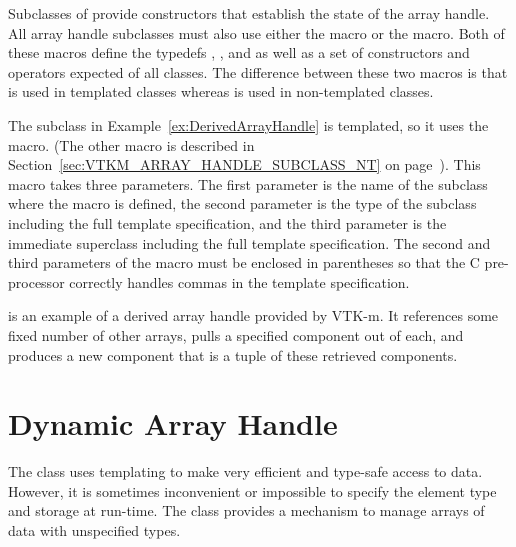 Subclasses of  provide constructors that
establish the state of the array handle. All array handle subclasses must
also use either the  macro or the
 macro. Both of these macros
define the typedefs , , and
 as well as a set of constructors and operators
expected of all  classes. The difference
between these two macros is that 
is used in templated classes whereas
 is used in non-templated
classes.

The  subclass in
Example~\ref{ex:DerivedArrayHandle} is templated, so it uses the
 macro. (The other macro is
described in Section~\ref{sec:VTKM_ARRAY_HANDLE_SUBCLASS_NT} on
page~\pageref{sec:VTKM_ARRAY_HANDLE_SUBCLASS_NT}). This macro takes three
parameters. The first parameter is the name of the subclass where the macro
is defined, the second parameter is the type of the subclass including the
full template specification, and the third parameter is the immediate
superclass including the full template specification. The second and third
parameters of the macro must be enclosed in parentheses so that the C
pre-processor correctly handles commas in the template specification.

 is an example of a derived array
handle provided by VTK-m. It references some fixed number of other arrays,
pulls a specified component out of each, and produces a new component that
is a tuple of these retrieved components.





\section{Dynamic Array Handle}
\label{sec:DynamicArrayHandle}


The  class uses templating to make very
efficient and type-safe access to data. However, it is sometimes
inconvenient or impossible to specify the element type and storage at
run-time. The  class provides a mechanism
to manage arrays of data with unspecified types.

